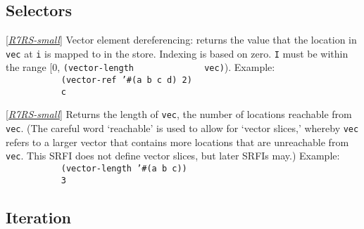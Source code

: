 \subsection{Selectors}


\begin{entry}{%
  }

  {[}\protect\hyperlink{R7RS-small}{\emph{R7RS-small}}{]} Vector
  element dereferencing: returns the value that the location in
  \texttt{vec} at \texttt{i} is mapped to in the store. Indexing is
  based on zero.  \texttt{I} must be within the range {[}0,
  \texttt{(vector-length~~~~~~~~~~~~~~vec)}).  Example:
  \texttt{~~~~~~~~~~~(vector-ref~'\#(a~b~c~d)~2)~~~~~~~~~}\\
  \texttt{~~~~~~~~~~~c~~~~~~~~~}
\end{entry}

\begin{entry}{%
  } 

  {[}\protect\hyperlink{R7RS-small}{\emph{R7RS-small}}{]}
  Returns the length of \texttt{vec}, the number of locations
  reachable from \texttt{vec}. (The careful word `reachable' is used
  to allow for `vector slices,' whereby \texttt{vec} refers to a
  larger vector that contains more locations that are unreachable from
  \texttt{vec}. This SRFI does not define vector slices, but later
  SRFIs may.)  Example:
  \texttt{~~~~~~~~~~~(vector-length~'\#(a~b~c))~~~~~~~~~}\\
  \texttt{~~~~~~~~~~~3~~~~~~~~~}
\end{entry}

\subsection{Iteration}



